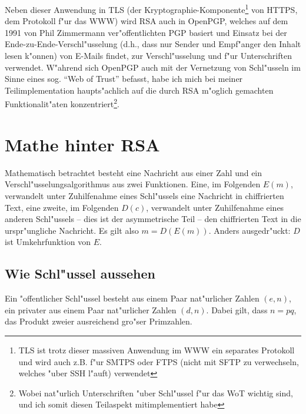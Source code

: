 \documentclass[12pt]{article}
\begin{document}
Neben dieser Anwendung in TLS (der Kryptographie-Komponente\footnote{
TLS ist trotz dieser massiven Anwendung im WWW ein separates Protokoll und wird auch z.B. f"ur SMTPS oder FTPS (nicht mit SFTP zu verwechseln, welches "uber SSH l"auft) verwendet}
von HTTPS, dem Protokoll f"ur das WWW) wird RSA auch in OpenPGP,
welches auf dem 1991 von Phil Zimmermann ver"offentlichten PGP basiert und Einsatz bei der Ende-zu-Ende-Verschl"usselung
(d.h., dass nur Sender und Empf"anger den Inhalt lesen k"on\-nen)
von E-Mails findet, zur Verschl"usselung und f"ur Unterschriften verwendet.
W"ah\-rend sich OpenPGP auch mit der Vernetzung von Schl"usseln im Sinne eines sog. "`Web of Trust"' befasst,
habe ich mich bei meiner Teilimplementation haupts"achlich auf die durch RSA m"oglich gemachten
Funktionalit"aten konzentriert\footnote{Wobei nat"urlich Unterschriften "uber Schl"ussel f"ur das WoT wichtig sind, und ich somit diesen Teilaspekt mitimplementiert habe}.

\section{Mathe hinter RSA}

Mathematisch betrachtet besteht eine Nachricht aus einer Zahl und ein Verschl"usselungsalgorithmus aus zwei Funktionen.
Eine, im Folgenden $E(m)$, verwandelt unter Zuhilfenahme eines Schl"ussels eine Nachricht in chiffrierten Text,
eine zweite, im Folgenden $D(c)$, verwandelt unter Zuhilfenahme eines anderen Schl"ussels -- dies ist der asymmetrische Teil --
den chiffrierten Text in die urspr"ungliche Nachricht. Es gilt also $m = D(E(m))$.
Anders ausgedr"uckt: $D$ ist Umkehrfunktion von $E$.~\cite{rsa}

\subsection{Wie Schl"ussel aussehen}
\label{subsec:rsa:keys}

Ein "offentlicher Schl"ussel besteht aus einem Paar nat"urlicher Zahlen $(e, n)$,
ein privater aus einem Paar nat"urlicher Zahlen $(d, n)$.
Dabei gilt, dass $n = pq$, das Produkt zweier ausreichend gro"ser Primzahlen.~\cite{rsa}
\end{document}
